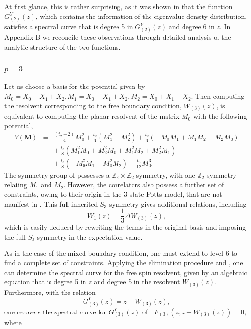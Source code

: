 At first glance, this is rather surprising, as it
was shown in \cite{Niedner:2016skw} that the function $G_{(2)}^Y(z)$, which contains the
information of the eigenvalue density distribution, satisfies a spectral curve that is degree 5 in
$G_{(2)}^Y(z)$ and degree 6 in $z$. In Appendix B we reconcile these observations through detailed analysis of the analytic structure of
the two functions.

\subsubsection{$p=3$}

Let us choose a basis for the potential  given by $M_0 = X_0 + X_1 + X_2, M_1 =
    X_0 - X_1 + X_2, M_2 = X_0 + X_1- X_2$. Then computing the resolvent corresponding to the free
boundary condition, $W_{(3)}(z)$, is equivalent to computing the planar resolvent of the matrix
$M_0$ with the following potential,
%
\begin{eqnarray}
    \label{freeAction}
    V(\mathbf{M}) & = & \frac{(t_2-2)}{4}M_0^2 + \frac{t_2}{4}(M_1^2 + M_2^2) + \frac{t_2}{4}(- M_0 M_1 + M_1 M_2 - M_2 M_0) \nonumber \\
                  &   & + \, \frac{t_3}{8}(M_1^2 M_0 + M_2^2 M_0 + M_1^2 M_2 + M_2^2 M_1) \\
                  &   & + \, \frac{t_3}{8}(- M_0^2 M_1 - M_0^2 M_2) + \frac{t_3}{12} M_0^3. \nonumber
\end{eqnarray}
%
The symmetry group of  possesses a $\mathbb{Z}_2\times\mathbb{Z}_2$ symmetry, with
one $\mathbb{Z}_2$ symmetry relating $M_1$ and $M_2$. However, the correlators also possess a
further set of constraints, owing to their origin in the 3-state Potts model, that are not manifest
in . This full inherited $S_3$ symmetry gives additional relations, including
%
\begin{equation}
    \label{extraCon}
    W_{1}(z) = \frac{1}{3} \Delta W_{(3)} (z),
\end{equation}
%
which is easily deduced by rewriting the terms in the original basis and imposing the full $S_3$
symmetry in the expectation value.

As in the case of the mixed boundary condition, one must extend to level 6 to find a complete set
of constraints. Applying the elimination procedure and , one can determine the
spectral curve for the free spin resolvent, given by an algebraic equation that is degree 5 in $z$
and degree 5 in the resolvent $W_{(3)}(z)$. Furthermore, with the relation
%
\begin{equation}
    \label{strange}
    G_{(3)}^Y(z) = z + W_{(3)}(z),
\end{equation}
%
one recovers the spectral curve for $G_{(3)}^Y(z)$ of \cite{Atkin:2015ksy}, $
    F_{(3)}\!\left(z,z+W_{(3)}(z)\right)=0$, where

